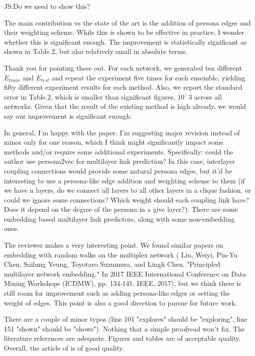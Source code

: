 \documentclass[12pt,a4paper]{article}
\newcommand{\response}[1]{{\leavevmode\noindent #1}}
\newcommand{\rcomment}[1]{%
\vspace{10pt}
\begin{tcolorbox}[colback=black!3,colframe=white!45!black]
#1
\end{tcolorbox}
}
\begin{document}
\response{%
JS:Do we need to show this?
}

\rcomment{%
The main contribution vs the state of the art is the addition of persona edges and their weighting scheme. While this is shown to be effective in practice, I wonder whether this is significant enough. The improvement is statistically significant as shown in Table 2, but also relatively small in absolute terms.
}

\response{%
Thank you for pointing these out.
For each network, we generated ten different $E_{train}$ and $E_{test}$ and repeat the experiment five times for each ensemble, yielding fifty different experiment results for each method. Also, we report the standard error in Table.2, which is smaller than significant figures, $10^-3$ across all networks. Given that the result of the existing method is high already, we would say our improvement is significant enough.
}


\rcomment{%
In general, I'm happy with the paper. I'm suggesting major revision instead of minor only for one reason, which I think might significantly impact some methods and/or require some additional experiments. Specifically: could the author use persona2vec for multilayer link prediction? In this case, interlayer coupling connections would provide some natural persona edges, but it'd be interesting to use a persona-like edge addition and weighting scheme to them (if we have n layers, do we connect all layers to all other layers in a clique fashion, or could we ignore some connections? Which weight should each coupling link have? Does it depend on the degree of the persona in a give layer?). There are some embedding based multilayer link predictors, along with some non-embedding ones.
}

\response{%
The reviewer makes a very interesting point. We found similar papers on embedding with random walks on the multiplex network ( Liu, Weiyi, Pin-Yu Chen, Sailung Yeung, Toyotaro Suzumura, and Lingli Chen. "Principled multilayer network embedding." In 2017 IEEE International Conference on Data Mining Workshops (ICDMW), pp. 134-141. IEEE, 2017), but we think there is still room for improvement such as adding persona-like edges or setting the weight of edges. This point is also a good direction to pursue for future work.
}

\rcomment{%
There are a couple of minor typos (line 101 "explores" should be "exploring", line 151 "shown" should be "shows"). Nothing that a simple proofread won't fix. The literature references are adequate. Figures and tables are of acceptable quality. Overall, the article of is of good quality.

}
\end{document}
